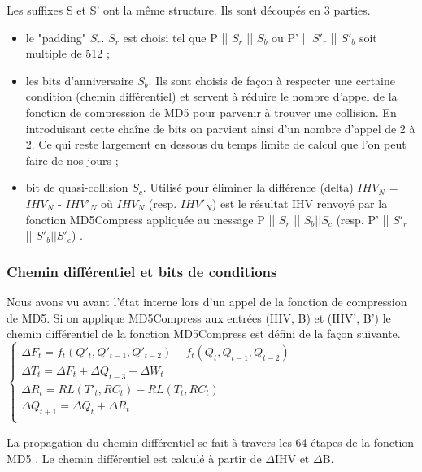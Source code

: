 Les suffixes S et S' ont la même structure. Ils sont découpés en 3 parties.
\begin{itemize}
\item le "padding" $S_{r}$. $S_{r}$ est choisi tel que P || $S_{r}$ || $S_{b}$ ou P' || $S'_{r}$ || $S'_{b}$ soit multiple de 512 ;
\item les bits d'anniversaire $S_{b}$. Ils sont choisis de façon à respecter une certaine condition (chemin différentiel) et servent à réduire le nombre d'appel de la fonction de compression de MD5 pour parvenir à trouver une collision. En introduisant cette chaîne de bits on parvient ainsi d'un nombre d'appel de 2 à 2. Ce qui reste largement en dessous du temps limite de calcul que l'on peut faire de nos jours ;
\item bit de quasi-collision $S_{c}$. Utilisé pour éliminer la différence (delta) $IHV_N$ = $IHV_N$ - $IHV'_N$ où $IHV_N$ (resp. $IHV'_N$) est le résultat IHV renvoyé par la fonction MD5Compress appliquée au message P || $S_{r}$ || $S_{b} || S_c$ (resp. P' || $S'_{r}$ || $S'_{b} || S'_c$) .
\end{itemize}
\vspace{.5cm}


\subsubsection{Chemin différentiel et bits de conditions}
Nous avons vu avant l'état interne lors d'un appel de la fonction de compression de MD5. Si on applique MD5Compress aux entrées (IHV, B) et (IHV', B') le chemin différentiel de la fonction MD5Compress est défini de la fa\c con suivante.\\

$\left\{
\begin{array}{l}
  \Delta F_t = f_t(Q'_t, Q'_{t-1}, Q'_{t-2}) - f_t(Q_t, Q_{t-1}, Q_{t-2}) \\
  \Delta T_t = \Delta F_t + \Delta Q_{t-3} + \Delta W_t \\
  \Delta R_t = RL(T'_t, RC_t) - RL(T_t, RC_t) \\
  \Delta Q_{t+1} = \Delta Q_t + \Delta R_t \\
\end{array}
\right.$
\vspace{.5cm}

La propagation du chemin différentiel se fait à travers les 64 étapes de la fonction MD5 . Le chemin différentiel est calculé à partir de $\Delta$IHV et $\Delta$B.

